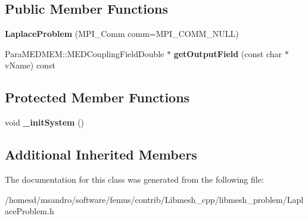 \subsection*{Public Member Functions}
\begin{DoxyCompactItemize}
\item 
\hypertarget{class_laplace_problem_a28b5175097fa2fd12f5e9eb2ac9ff185}{{\bfseries Laplace\-Problem} (M\-P\-I\-\_\-\-Comm comm=M\-P\-I\-\_\-\-C\-O\-M\-M\-\_\-\-N\-U\-L\-L)}\label{class_laplace_problem_a28b5175097fa2fd12f5e9eb2ac9ff185}

\item 
\hypertarget{class_laplace_problem_aded2bdc3c30a256f6f8ac62ab29aef4b}{Para\-M\-E\-D\-M\-E\-M\-::\-M\-E\-D\-Coupling\-Field\-Double $\ast$ {\bfseries get\-Output\-Field} (const char $\ast$v\-Name) const }\label{class_laplace_problem_aded2bdc3c30a256f6f8ac62ab29aef4b}

\end{DoxyCompactItemize}
\subsection*{Protected Member Functions}
\begin{DoxyCompactItemize}
\item 
\hypertarget{class_laplace_problem_a3ce2b1fee526c7345b28ee856721c763}{void {\bfseries \-\_\-init\-System} ()}\label{class_laplace_problem_a3ce2b1fee526c7345b28ee856721c763}

\end{DoxyCompactItemize}
\subsection*{Additional Inherited Members}


The documentation for this class was generated from the following file\-:\begin{DoxyCompactItemize}
\item 
/homesd/msandro/software/femus/contrib/\-Libmesh\-\_\-cpp/libmesh\-\_\-problem/Laplace\-Problem.\-h\end{DoxyCompactItemize}
